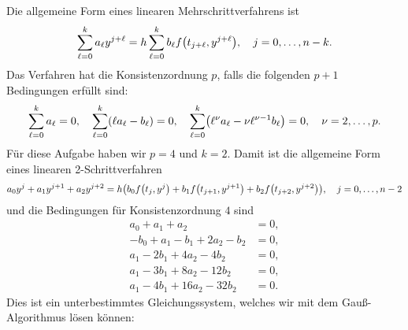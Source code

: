 \documentclass{exercise}
\begin{document}
	Die allgemeine Form eines linearen Mehrschrittverfahrens ist
	\[
		\sum_{\ell = 0}^k a_\ell y^{j + \ell} = h\sum_{\ell = 0}^k b_\ell f\parentheses*{t_{j + \ell}, y^{j + \ell}}, \quad j = 0, \ldots, n - k.
	\]
	Das Verfahren hat die Konsistenzordnung \(p\), falls die folgenden \(p + 1\) Bedingungen erfüllt sind:
	\[
		\sum_{\ell = 0}^k a_\ell = 0, \quad \sum_{\ell = 0}^k \parentheses*{\ell a_\ell - b_\ell} = 0, \quad \sum_{\ell = 0}^k \parentheses*{\ell^\nu a_\ell - \nu\ell^{\nu - 1}b_\ell} = 0, \quad \nu = 2, \ldots, p.
	\]
	Für diese Aufgabe haben wir \(p = 4\) und \(k = 2\).
	Damit ist die allgemeine Form eines linearen 2-Schrittverfahren
	\[
		a_0 y^j + a_1 y^{j + 1} + a_2 y^{j + 2} = h\parentheses*{b_0 f\parentheses*{t_j, y^j} + b_1 f\parentheses*{t_{j + 1}, y^{j + 1}} + b_2 f\parentheses*{t_{j + 2}, y^{j + 2}}}, \quad j = 0, \ldots, n - 2
	\]
	und die Bedingungen für Konsistenzordnung \(4\) sind
	\begin{align*}
		a_0 + a_1 + a_2 &= 0,\\
		-b_0 + a_1 - b_1 + 2a_2 - b_2 &= 0,\\
		a_1 - 2b_1 + 4a_2 - 4b_2 &= 0,\\
		a_1 - 3b_1 + 8a_2 - 12b_2 &= 0,\\
		a_1 - 4b_1 + 16a_2 - 32b_2 &= 0.
	\end{align*}
	Dies ist ein unterbestimmtes Gleichungssystem, welches wir mit dem Gauß-Algorithmus lösen können:
\end{document}
